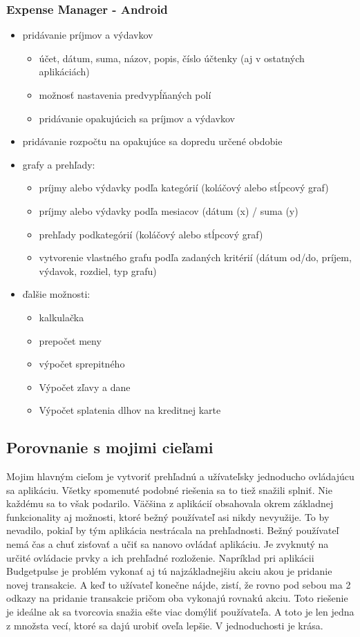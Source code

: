 \documentclass[12pt]{book}
\begin{document}
\subsubsection{Expense Manager - Android \cite{ExpenseManager}\ }
\begin{itemize}
\item{pridávanie príjmov a výdavkov}
\begin{itemize}
\item{účet, dátum, suma, názov, popis, číslo účtenky (aj v ostatných aplikáciách)}
\item{možnosť nastavenia predvypĺňaných polí}
\item{pridávanie opakujúcich sa príjmov a výdavkov}
\end{itemize}
\item{pridávanie rozpočtu na opakujúce sa dopredu určené obdobie}
\item{grafy a prehľady:}
\begin{itemize}
\item{príjmy alebo výdavky podľa kategórií (koláčový alebo stĺpcový graf)}
\item{príjmy alebo výdavky podľa mesiacov (dátum (x) / suma (y)}
\item{prehľady podkategórií (koláčový alebo stĺpcový graf)}
\item{vytvorenie vlastného grafu podľa zadaných kritérií (dátum od/do, príjem, výdavok, rozdiel, typ grafu)}
\end{itemize}
\item{ďalšie možnosti:}
\begin{itemize}
\item{kalkulačka}
\item{prepočet meny}
\item{výpočet sprepitného}
\item{Výpočet zľavy a dane}
\item{Výpočet splatenia dlhov na kreditnej karte}
\end{itemize}
\end{itemize}

\subsection{Porovnanie s mojimi cieľami}
Mojim hlavným cieľom je vytvoriť prehľadnú a užívateľsky jednoducho ovládajúcu sa aplikáciu. Všetky spomenuté podobné riešenia sa to tiež snažili splniť. Nie každému sa to však podarilo. Väčšina z aplikácií obsahovala okrem základnej funkcionality aj možnosti, ktoré bežný používateľ asi nikdy nevyužije. To by nevadilo, pokiaľ by tým aplikácia nestrácala na prehľadnosti. Bežný používateľ nemá čas a chuť zisťovať a učiť sa nanovo ovládať aplikáciu. Je zvyknutý na určité ovládacie prvky a ich prehľadné rozloženie. Napríklad pri aplikácii Budgetpulse je problém vykonať aj tú najzákladnejšiu akciu akou je pridanie novej transakcie. A keď to užívateľ konečne nájde, zistí, že rovno pod sebou ma 2 odkazy na pridanie transakcie pričom oba vykonajú rovnakú akciu. Toto riešenie je ideálne ak sa tvorcovia snažia ešte viac domýliť používateľa. A toto je len jedna z množsta vecí, ktoré sa dajú urobiť oveľa lepšie. V jednoduchosti je krása.
\end{document}
